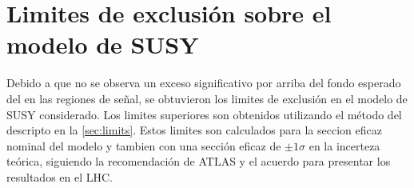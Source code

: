 










\section{Limites de exclusión sobre el modelo de SUSY}

Debido a que no se observa un exceso significativo por arriba del fondo esperado
del {\SM} en las regiones de señal, se obtuvieron los limites de exclusión en el
modelo de SUSY considerado. Los limites superiores son obtenidos utilizando el
método del {\cls} descripto en la \cref{sec:limits}. Estos limites son
calculados para la seccion eficaz nominal del modelo y tambien con una sección
eficaz de $\pm 1 \sigma$ en la incerteza teórica, siguiendo la recomendación de
ATLAS y el acuerdo para presentar los resultados en el LHC.

